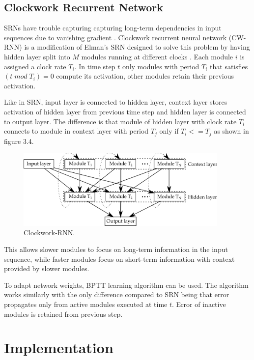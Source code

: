 \documentclass[12pt,oneside]{fithesis2}
\begin{document}
\section{Clockwork Recurrent Network}
SRNs have trouble capturing capturing long-term dependencies in input sequences due to vanishing gradient \cite{vanishing-gradient}. Clockwork recurrent neural network (CW-RNN) is a modification of Elman's SRN designed to solve this problem by having hidden layer split into $M$ modules running at different clocks \cite{cw-rnn}.
Each module $i$ is assigned a clock rate $T_i$. In time step $t$ only modules with period $T_i$ that satisfies $(t \; mod \; T_i) = 0$ compute its activation, other modules retain their previous activation.  \par

Like in SRN, input layer is connected to hidden layer, context layer stores activation of hidden layer from previous time step and hidden layer is connected to output layer. The difference is that module of hidden layer with clock rate $T_i$ connects to module in context layer with period $T_j$ only if $T_i <= T_j$ as shown in figure 3.4.
	\begin{figure}[ht]
		\centering
		\includegraphics[width=394px]{cw-rnn.png}
		\caption{Clockwork-RNN. }
	\end{figure}
This allows slower modules to focus on long-term information in the input sequence, while faster modules focus on short-term information with context provided by slower modules. \par

To adapt network weights, BPTT learning algorithm can be used. The algorithm works similarly with the only difference compared to SRN being that error propagates only from active modules executed at time $t$. Error of inactive modules is retained from previous step. \par
      
\chapter{Implementation}
\end{document}
